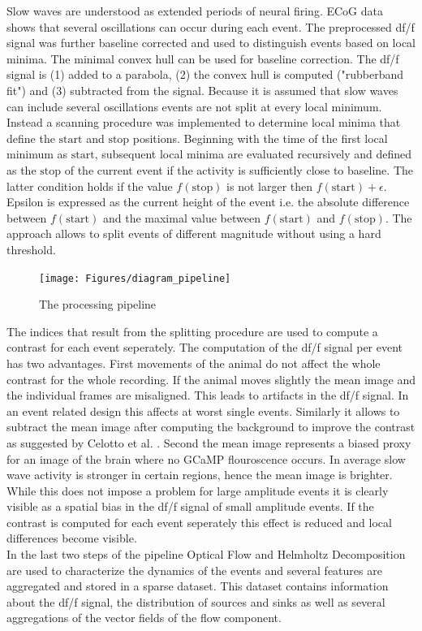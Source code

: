 Slow waves are understood as extended periods of neural firing. ECoG data shows that several oscillations can occur during each event. The preprocessed df/f signal was further baseline corrected and used to distinguish events based on local minima. The minimal convex hull can be used for baseline correction. The df/f signal is (1) added to a parabola, (2) the convex hull is computed ("rubberband fit") and (3) subtracted from the signal. Because it is assumed that slow waves can include several oscillations events are not split at every local minimum. Instead a scanning procedure was implemented to determine local minima that define the $\text{start}$ and $\text{stop}$ positions. Beginning with the time of the first local minimum as $\text{start}$, subsequent local minima are evaluated recursively and defined as the $\text{stop}$ of the current event if the activity is sufficiently close to baseline. The latter condition holds if the value $f(\text{stop})$ is not larger then $f(\text{start}) + \epsilon$. Epsilon is expressed as the current height of the event i.e. the absolute difference between $f(\text{start})$ and the maximal value between $f(\text{start})$ and $f(\text{stop})$. The approach allows to split events of different magnitude without using a hard threshold.\\
\begin{figure}[!htb]
\centering
\texttt{[image: Figures/diagram\_pipeline]}
\decoRule
\caption[The processing pipeline]{The processing pipeline}
\label{fig:diagram_pipeline}
\end{figure}
The indices that result from the splitting procedure are used to compute a contrast for each event seperately. The computation of the df/f signal per event has two advantages. First movements of the animal do not affect the whole contrast for the whole recording. If the animal moves slightly the mean image and the individual frames are misaligned. This leads to artifacts in the df/f signal. In an event related design this affects at worst single events. Similarly it allows to subtract the mean image after computing the background to improve the contrast as suggested by Celotto et al. \parencite{celotto2020analysis}. Second the mean image represents a biased proxy for an image of the brain where no GCaMP flouroscence occurs. In average slow wave activity is stronger in certain regions, hence the mean image is brighter. While this does not impose a problem for large amplitude events it is clearly visible as a spatial bias in the df/f signal of small amplitude events. If the contrast is computed for each event seperately this effect is reduced and local differences become visible.\\
In the last two steps of the pipeline Optical Flow and Helmholtz Decomposition are used to characterize the dynamics of the events and several features are aggregated and stored in a sparse dataset. This dataset contains information about the df/f signal, the distribution of sources and sinks as well as several aggregations of the vector fields of the flow component.
